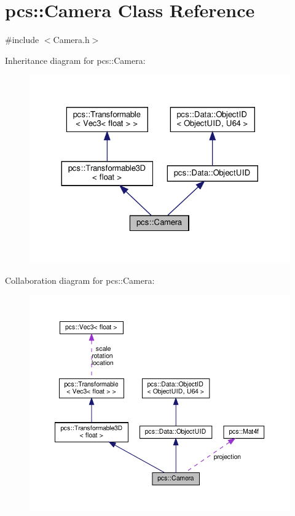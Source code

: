 \hypertarget{classpcs_1_1Camera}{}\section{pcs\+:\+:Camera Class Reference}
\label{classpcs_1_1Camera}


{\ttfamily \#include $<$Camera.\+h$>$}



Inheritance diagram for pcs\+:\+:Camera\+:\nopagebreak
\begin{figure}[H]
\begin{center}
\leavevmode
\includegraphics[width=324pt]{classpcs_1_1Camera__inherit__graph}
\end{center}
\end{figure}


Collaboration diagram for pcs\+:\+:Camera\+:\nopagebreak
\begin{figure}[H]
\begin{center}
\leavevmode
\includegraphics[width=350pt]{classpcs_1_1Camera__coll__graph}
\end{center}
\end{figure}
